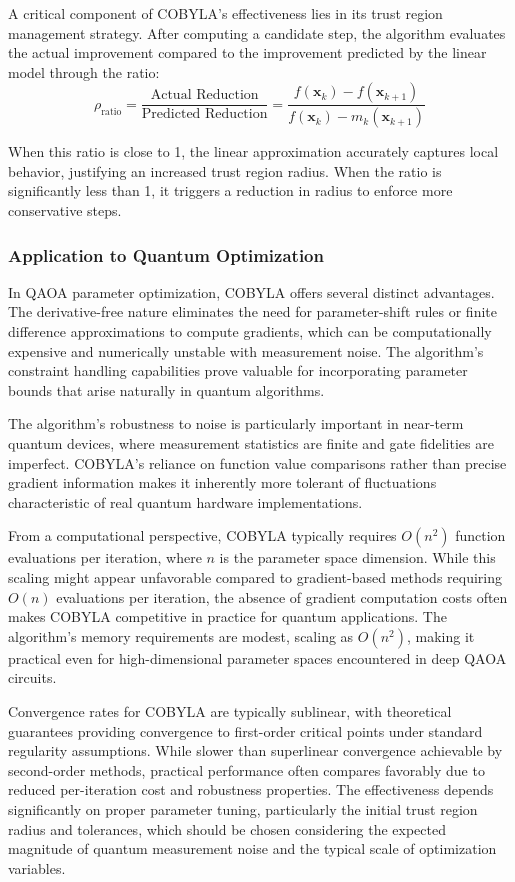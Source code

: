 \documentclass[%
 reprint,
 amsmath,amssymb,
 aps,
]{revtex4-2}
\begin{document}
A critical component of COBYLA's effectiveness lies in its trust region management strategy. After computing a candidate step, the algorithm evaluates the actual improvement compared to the improvement predicted by the linear model through the ratio:
$$\rho_{\text{ratio}} = \frac{\text{Actual Reduction}}{\text{Predicted Reduction}} = \frac{f(\mathbf{x}_k) - f(\mathbf{x}_{k+1})}{f(\mathbf{x}_k) - m_k(\mathbf{x}_{k+1})}$$

When this ratio is close to 1, the linear approximation accurately captures local behavior, justifying an increased trust region radius. When the ratio is significantly less than 1, it triggers a reduction in radius to enforce more conservative steps.

\subsubsection{Application to Quantum Optimization}

In QAOA parameter optimization, COBYLA offers several distinct advantages. The derivative-free nature eliminates the need for parameter-shift rules or finite difference approximations to compute gradients, which can be computationally expensive and numerically unstable with measurement noise. The algorithm's constraint handling capabilities prove valuable for incorporating parameter bounds that arise naturally in quantum algorithms.

The algorithm's robustness to noise is particularly important in near-term quantum devices, where measurement statistics are finite and gate fidelities are imperfect. COBYLA's reliance on function value comparisons rather than precise gradient information makes it inherently more tolerant of fluctuations characteristic of real quantum hardware implementations.

From a computational perspective, COBYLA typically requires $O(n^2)$ function evaluations per iteration, where $n$ is the parameter space dimension. While this scaling might appear unfavorable compared to gradient-based methods requiring $O(n)$ evaluations per iteration, the absence of gradient computation costs often makes COBYLA competitive in practice for quantum applications. The algorithm's memory requirements are modest, scaling as $O(n^2)$, making it practical even for high-dimensional parameter spaces encountered in deep QAOA circuits.

Convergence rates for COBYLA are typically sublinear, with theoretical guarantees providing convergence to first-order critical points under standard regularity assumptions. While slower than superlinear convergence achievable by second-order methods, practical performance often compares favorably due to reduced per-iteration cost and robustness properties. The effectiveness depends significantly on proper parameter tuning, particularly the initial trust region radius and tolerances, which should be chosen considering the expected magnitude of quantum measurement noise and the typical scale of optimization variables.
\end{document}

